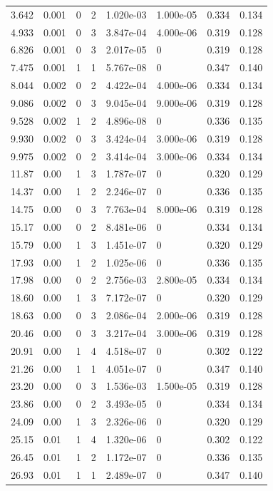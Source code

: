 \documentclass[preview]{standalone}
\begin{document}
{{\begin{tabular}{L{1.2cm}C{1.2cm} C{0.3cm}C{0.5cm} C{1.4cm}C{1.4cm} C{1.4cm}C{1.4cm}}
  3.642  &  0.001  & 0     &  2 &  1.020e-03  & 1.000e-05  & 0.334 &  0.134   \\ 
  4.933  &  0.001  & 0     &  3 &  3.847e-04  & 4.000e-06  & 0.319 &  0.128   \\ 
  6.826  &  0.001  & 0     &  3 &  2.017e-05  & 0  & 0.319 &  0.128   \\ 
  7.475  &  0.001  & 1     &  1 &  5.767e-08  & 0  & 0.347 &  0.140   \\ 
  8.044  &  0.002  & 0     &  2 &  4.422e-04  & 4.000e-06  & 0.334 &  0.134   \\ 
  9.086  &  0.002  & 0     &  3 &  9.045e-04  & 9.000e-06  & 0.319 &  0.128   \\ 
  9.528  &  0.002  & 1     &  2 &  4.896e-08  & 0  & 0.336 &  0.135   \\ 
  9.930  &  0.002  & 0     &  3 &  3.424e-04  & 3.000e-06  & 0.319 &  0.128   \\ 
  9.975  &  0.002  & 0     &  2 &  3.414e-04  & 3.000e-06  & 0.334 &  0.134   \\ 
  11.87  &  0.00  & 1     &  3 &  1.787e-07  & 0  & 0.320 &  0.129   \\ 
  14.37  &  0.00  & 1     &  2 &  2.246e-07  & 0  & 0.336 &  0.135   \\ 
  14.75  &  0.00  & 0     &  3 &  7.763e-04  & 8.000e-06  & 0.319 &  0.128   \\ 
  15.17  &  0.00  & 0     &  2 &  8.481e-06  & 0  & 0.334 &  0.134   \\ 
  15.79  &  0.00  & 1     &  3 &  1.451e-07  & 0  & 0.320 &  0.129   \\ 
  17.93  &  0.00  & 1     &  2 &  1.025e-06  & 0  & 0.336 &  0.135   \\ 
  17.98  &  0.00  & 0     &  2 &  2.756e-03  & 2.800e-05  & 0.334 &  0.134   \\ 
  18.60  &  0.00  & 1     &  3 &  7.172e-07  & 0  & 0.320 &  0.129   \\ 
  18.63  &  0.00  & 0     &  3 &  2.086e-04  & 2.000e-06  & 0.319 &  0.128   \\ 
  20.46  &  0.00  & 0     &  3 &  3.217e-04  & 3.000e-06  & 0.319 &  0.128   \\ 
  20.91  &  0.00  & 1     &  4 &  4.518e-07  & 0  & 0.302 &  0.122   \\ 
  21.26  &  0.00  & 1     &  1 &  4.051e-07  & 0  & 0.347 &  0.140   \\ 
  23.20  &  0.00  & 0     &  3 &  1.536e-03  & 1.500e-05  & 0.319 &  0.128   \\ 
  23.86  &  0.00  & 0     &  2 &  3.493e-05  & 0  & 0.334 &  0.134   \\ 
  24.09  &  0.00  & 1     &  3 &  2.326e-06  & 0  & 0.320 &  0.129   \\ 
  25.15  &  0.01  & 1     &  4 &  1.320e-06  & 0  & 0.302 &  0.122   \\ 
  26.45  &  0.01  & 1     &  2 &  1.172e-07  & 0  & 0.336 &  0.135   \\ 
  26.93  &  0.01  & 1     &  1 &  2.489e-07  & 0  & 0.347 &  0.140   \\ 
\hline 
\end{tabular} 

}}
\end{document}

